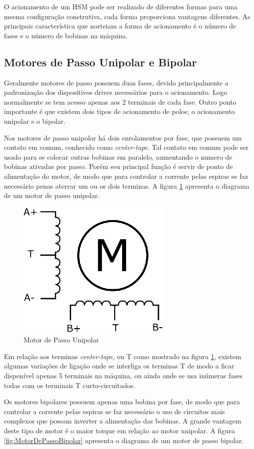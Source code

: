 O acionamento de um HSM pode ser realizado de diferentes formas para uma mesma configuração construtiva, cada forma proporciona vantagens diferentes. As principais característica que norteiam a forma de acionamento  é o número de  fases e o número de bobinas na máquina.

\subsection{Motores de Passo Unipolar e Bipolar}

Geralmente motores de passo possuem duas fases, devido principalmente a padronização dos dispositivos drives necessários para o acionamento. Logo normalmente se tem acesso apenas aos 2 terminais de cada fase. Outro ponto importante é que existem dois tipos de acionamento de polos; o acionamento unipolar e o bipolar.  

Nos motores de passo unipolar há dois enrolamentos por fase, que possuem um contato em comum, conhecido como \emph{center-tape}. Tal contato em comum pode ser usado para se colocar outras bobinas em paralelo, aumentando o numero de bobinas ativadas por passo. Porém seu principal função é servir de ponto de alimentação do motor, de modo que para controlar a corrente pelas espiras se faz necessário penas aterrar um ou os dois terminas. A figura \ref{fig:MotorDePassoUnipolar} apresenta o diagrama de um motor de passo unipolar. 

\begin{figure}[H]
	\centering
	\includegraphics[width = 0.3 \columnwidth]{images/MotorDePassoUnipolar.eps}
	\caption{Motor de Passo Unipolar}
	\label{fig:MotorDePassoUnipolar}
\end{figure} 

Em relação aos terminas \emph{center-tape}, ou T como mostrado na figura \ref{fig:MotorDePassoUnipolar}, existem algumas variações de ligação onde se interliga os terminas T de modo a ficar disponível apenas 5 terminais na máquina, ou ainda onde se usa inúmeras fases todas com os terminais T curto-circuitados.   

Os motores bipolares possuem apenas uma bobina por fase, de modo que para controlar a corrente pelas espiras se faz necessário o uso de circuitos mais complexos que possam inverter a alimentação das bobinas. A grande vantagem deste tipo de motor é o maior torque em relação ao motor unipolar. A figura \ref{fig:MotorDePassoBipolar} apresenta o diagrama de um motor de passo bipolar.

